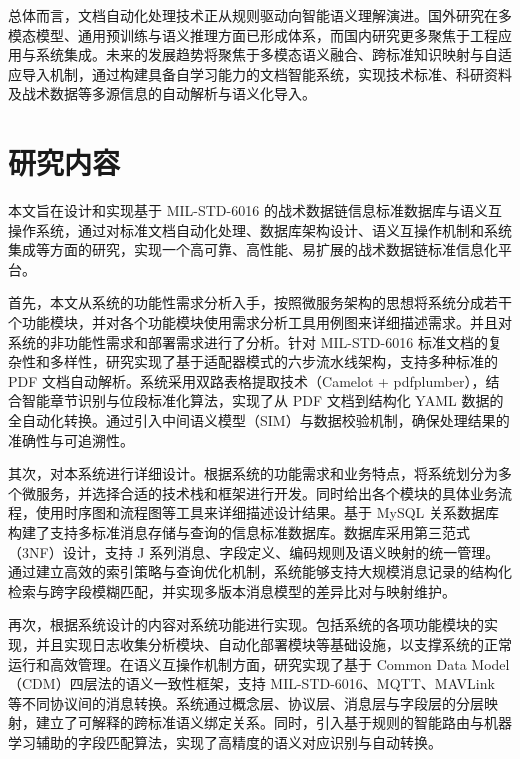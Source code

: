 总体而言，文档自动化处理技术正从规则驱动向智能语义理解演进。国外研究在多模态模型、通用预训练与语义推理方面已形成体系，而国内研究更多聚焦于工程应用与系统集成。未来的发展趋势将聚焦于多模态语义融合、跨标准知识映射与自适应导入机制，通过构建具备自学习能力的文档智能系统，实现技术标准、科研资料及战术数据等多源信息的自动解析与语义化导入。


\section{研究内容}

本文旨在设计和实现基于 MIL-STD-6016 的战术数据链信息标准数据库与语义互操作系统，通过对标准文档自动化处理、数据库架构设计、语义互操作机制和系统集成等方面的研究，实现一个高可靠、高性能、易扩展的战术数据链标准信息化平台。

首先，本文从系统的功能性需求分析入手，按照微服务架构的思想将系统分成若干个功能模块，并对各个功能模块使用需求分析工具用例图来详细描述需求。并且对系统的非功能性需求和部署需求进行了分析。针对 MIL-STD-6016 标准文档的复杂性和多样性，研究实现了基于适配器模式的六步流水线架构，支持多种标准的 PDF 文档自动解析\cite{MIL_STD_6016_Active_2024,MITRE_Link16_Interoperability_2024}。系统采用双路表格提取技术（Camelot + pdfplumber），结合智能章节识别与位段标准化算法，实现了从 PDF 文档到结构化 YAML 数据的全自动化转换。通过引入中间语义模型（SIM）与数据校验机制，确保处理结果的准确性与可追溯性。

其次，对本系统进行详细设计。根据系统的功能需求和业务特点，将系统划分为多个微服务，并选择合适的技术栈和框架进行开发。同时给出各个模块的具体业务流程，使用时序图和流程图等工具来详细描述设计结果。基于 MySQL 关系数据库构建了支持多标准消息存储与查询的信息标准数据库\cite{Laigner2021Data,Waseem2021Design}。数据库采用第三范式（3NF）设计，支持 J 系列消息、字段定义、编码规则及语义映射的统一管理。通过建立高效的索引策略与查询优化机制，系统能够支持大规模消息记录的结构化检索与跨字段模糊匹配，并实现多版本消息模型的差异比对与映射维护。

再次，根据系统设计的内容对系统功能进行实现。包括系统的各项功能模块的实现，并且实现日志收集分析模块、自动化部署模块等基础设施，以支撑系统的正常运行和高效管理。在语义互操作机制方面，研究实现了基于 Common Data Model（CDM）四层法的语义一致性框架，支持 MIL-STD-6016、MQTT、MAVLink 等不同协议间的消息转换\cite{Hamdan2023Reference,MITRE_Link16_Interoperability_2024}。系统通过概念层、协议层、消息层与字段层的分层映射，建立了可解释的跨标准语义绑定关系。同时，引入基于规则的智能路由与机器学习辅助的字段匹配算法，实现了高精度的语义对应识别与自动转换。


